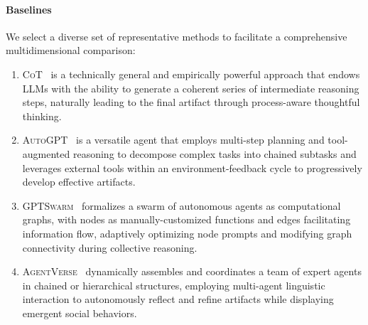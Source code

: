 \documentclass{article}
\begin{document}
\paragraph{Baselines} We select a diverse set of representative methods to facilitate a comprehensive multidimensional comparison:
\begin{enumerate}[$\bullet$]
\setlength{\itemsep}{0pt}
\setlength{\parsep}{0pt}
\item \textsc{CoT}~\citep{wei2022chain} is a technically general and empirically powerful approach that endows LLMs with the ability to generate a coherent series of intermediate reasoning steps, naturally leading to the final artifact through process-aware thoughtful thinking.
\item \textsc{AutoGPT}~\citep{AutoGPT} is a versatile agent that employs multi-step planning and tool-augmented reasoning to decompose complex tasks into chained subtasks and leverages external tools within an environment-feedback cycle to progressively develop effective artifacts.
\item \textsc{GPTSwarm}~\citep{zhuge2024language} formalizes a swarm of autonomous agents as computational graphs, with nodes as manually-customized functions and edges facilitating information flow, adaptively optimizing node prompts and modifying graph connectivity during collective reasoning.
\item \textsc{AgentVerse}~\citep{chen2023agentverse} dynamically assembles and coordinates a team of expert agents in chained or hierarchical structures, employing multi-agent linguistic interaction to autonomously reflect and refine artifacts while displaying emergent social behaviors.
\end{enumerate}
\end{document}
